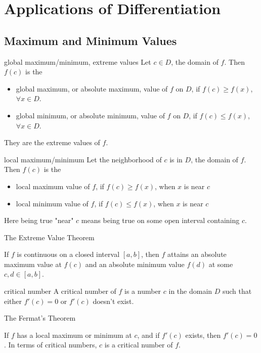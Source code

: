 \documentclass[Calculus 1 Recitation.tex]{subfiles}
\begin{document}
\section{Applications of Differentiation}
\subsection{Maximum and Minimum Values}
\begin{myleftlinebox}
	global maximum/minimum, extreme values
	\tcblower
	Let $c\in D$, the domain of $f$. Then $f(c)$ is the
	\begin{itemize}
		\item global maximum, or absolute maximum, value of $f$ on $D$, if $f(c)\geq f(x)$, $\forall x\in D$.
		\item global minimum, or absolute minimum, value of $f$ on $D$, if $f(c)\leq f(x)$, $\forall x\in D$.
	\end{itemize}
	They are the extreme values of $f$.
\end{myleftlinebox}

\begin{myleftlinebox}
	local maximum/minimum
	\tcblower
	Let the neighborhood of $c$ is in $D$, the domain of $f$. Then $f(c)$ is the
	\begin{itemize}
		\item local maximum value of $f$, if $f(c)\geq f(x)$, when $x$ is near $c$
		\item local minimum value of $f$, if $f(c)\leq f(x)$, when $x$ is near $c$
	\end{itemize}
	Here being true "near" $c$ means being true on some open interval containing $c$.
\end{myleftlinebox}

\begin{myleftlinebox}
	The Extreme Value Theorem
	\tcblower
	\begin{theorem}
		If $f$ is continuous on a closed interval $[a,b]$, then $f$ attains an absolute maximum value at $f(c)$ and an absolute minimum value $f(d)$ at some $c,d\in[a,b]$.
	\end{theorem}
\end{myleftlinebox}

\begin{myleftlinebox}
	critical number
	\tcblower
	A critical number of $f$ is a number $c$ in the domain $D$ such that either $f'(c)=0$ or $f'(c)$ doesn't exist.
\end{myleftlinebox}

\begin{myleftlinebox}
	The Fermat's Theorem
	\tcblower
	\begin{theorem}
		If $f$ has a local maximum or minimum at $c$, and if $f'(c)$ exists, then $f'(c)=0$. In terms of critical numbers, $c$ is a critical number of $f$.
	\end{theorem}
\end{myleftlinebox}
\end{document}
